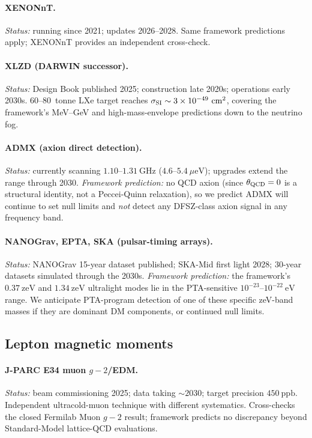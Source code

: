 \documentclass[reprint,amsmath,amssymb,aps,prd,longbibliography,floatfix]{revtex4-2}
\begin{document}
\paragraph{XENONnT.}
\emph{Status:} running since 2021; updates 2026--2028. Same
framework predictions apply; XENONnT provides an independent
cross-check.

\paragraph{XLZD (DARWIN successor).}
\emph{Status:} Design Book published 2025; construction late 2020s;
operations early 2030s. 60--80~tonne LXe target reaches
$\sigma_{\rm SI} \sim 3\times 10^{-49}~\mathrm{cm}^2$, covering the
framework's MeV--GeV and high-mass-envelope predictions down to
the neutrino fog.

\paragraph{ADMX (axion direct detection).}
\emph{Status:} currently scanning $1.10$--$1.31~\mathrm{GHz}$
($4.6$--$5.4~\mu\mathrm{eV}$); upgrades extend the range through
2030. \emph{Framework prediction:} no QCD axion (since $\theta_{\rm QCD}
= 0$ is a structural identity, not a Peccei-Quinn relaxation), so
we predict ADMX will continue to set null limits and
\emph{not} detect any DFSZ-class axion signal in any frequency
band.

\paragraph{NANOGrav, EPTA, SKA (pulsar-timing arrays).}
\emph{Status:} NANOGrav 15-year dataset published; SKA-Mid first
light 2028; 30-year datasets simulated through the 2030s.
\emph{Framework prediction:} the framework's $0.37~\mathrm{zeV}$ and
$1.34~\mathrm{zeV}$ ultralight modes lie in the PTA-sensitive
$10^{-23}$--$10^{-22}~\mathrm{eV}$ range. We anticipate
PTA-program detection of one of these specific zeV-band masses if
they are dominant DM components, or continued null limits.

\subsection*{Lepton magnetic moments}

\paragraph{J-PARC E34 muon $g{-}2$/EDM.}
\emph{Status:} beam commissioning 2025; data taking $\sim\!2030$;
target precision $450~\mathrm{ppb}$. Independent ultracold-muon
technique with different systematics. Cross-checks the closed
Fermilab Muon $g{-}2$ result; framework predicts no discrepancy
beyond Standard-Model lattice-QCD evaluations.
\end{document}
